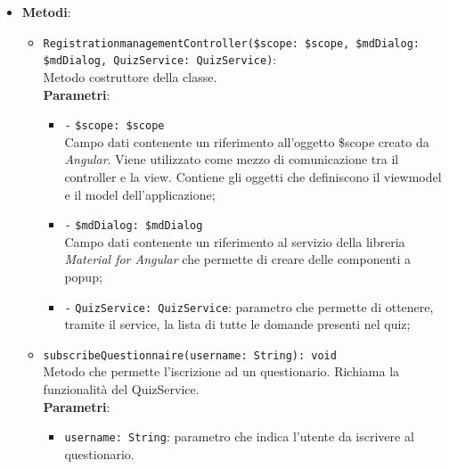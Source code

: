\begin{itemize}
\begin{itemize}
	\end{itemize}
	\item \textbf{Metodi}:
	\begin{itemize}
		\item \texttt{RegistrationmanagementController(\$scope: \$scope, \$mdDialog: \$mdDialog, QuizService: QuizService)}: \\Metodo costruttore della classe. \\
			\textbf{Parametri}:
			\begin{itemize}
					\item \texttt{-} \texttt{\$scope: \$scope} \\
					Campo dati contenente un riferimento all’oggetto \$scope creato da \textit{Angular}. Viene utilizzato come mezzo di comunicazione tra il controller e la view. Contiene gli oggetti che definiscono il viewmodel e il model dell’applicazione;
					\item \texttt{-} \texttt{\$mdDialog: \$mdDialog} \\
					Campo dati contenente un riferimento al servizio della libreria \textit{Material for Angular} che permette di creare delle componenti a popup;
					\item \texttt{-} \texttt{QuizService: QuizService}: parametro che permette di ottenere, tramite il service, la lista di tutte le domande presenti nel quiz; 
			\end{itemize}
		\item \texttt{subscribeQuestionnaire(username: String): void} \\ Metodo che permette l'iscrizione ad un questionario. Richiama la funzionalità del QuizService. \\
		\textbf{Parametri}:
		\begin{itemize}
			\item \texttt{username: String}: parametro che indica l'utente da iscrivere al questionario.
		\end{itemize}
	\end{itemize}
\end{itemize}

